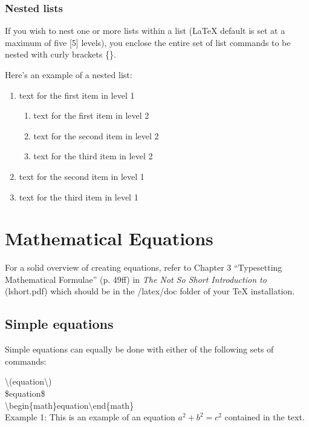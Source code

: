 \documentclass[12pt]{MUNThesisBibTeX}
\begin{document}
\subsection{Nested lists}

If you wish to nest one or more lists within a list (LaTeX default is set at a maximum of five [5] levels), you enclose the entire set of list commands to be nested with curly brackets \{\}.

Here's an example of a nested list:

\begin{enumerate}
\item text for the first item in level 1
{\begin{enumerate}
\item text for the first item in level 2
\item text for the second item in level 2
\item text for the third item in level 2
\end{enumerate}}
\item text for the second item in level 1
\item text for the third item in level 1
\end{enumerate}


\chapter{Mathematical Equations}

For a solid overview of creating equations, refer to Chapter 3 “Typesetting Mathematical Formulae” (p. 49ff) in \emph{The Not So Short Introduction to \LaTeXe} (lshort.pdf) which should be in the /latex/doc folder of your TeX installation.

\section{Simple equations}
Simple equations can equally be done with either of the following sets of commands:

\textbackslash (equation\textbackslash )\\
\$equation\$\\
\textbackslash begin\{math\}equation\textbackslash end\{math\}\\

Example 1: This is an example of an equation \(a^2 + b^2 = c^2\) contained in the text.
\end{document}
